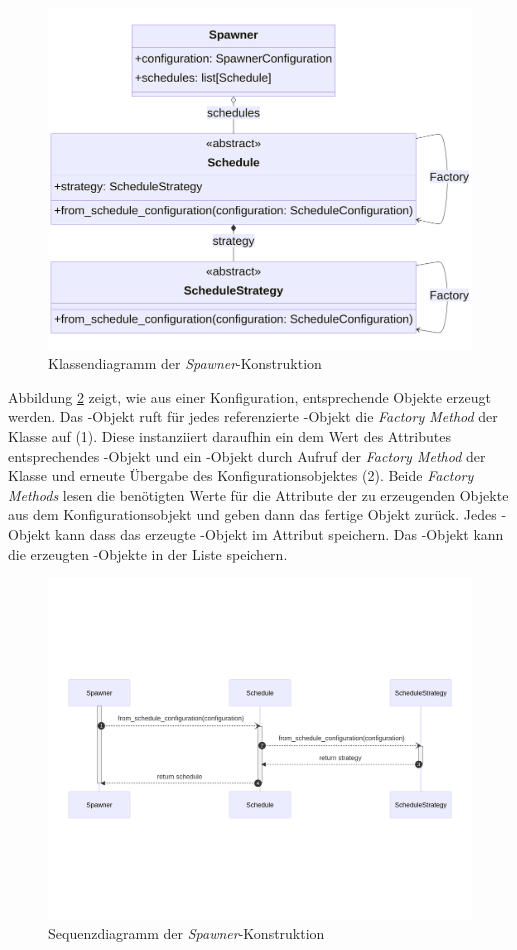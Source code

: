 \begin{figure}[H]
	\centering
	\includegraphics[width=1.0\linewidth]{images/diagrams/spawner-factory-class.png}
	\caption{Klassendiagramm der \emph{Spawner}-Konstruktion}
	\label{fig:spawner-factory-class}
\end{figure}

Abbildung \ref{fig:spawner-factory-seq} zeigt, wie aus einer Konfiguration, entsprechende Objekte erzeugt werden. Das -Objekt ruft für jedes referenzierte -Objekt die \emph{Factory Method} der Klasse  auf (1). Diese instanziiert daraufhin ein dem Wert des Attributes  entsprechendes -Objekt und ein -Objekt durch Aufruf der \emph{Factory Method} der Klasse  und erneute Übergabe des Konfigurationsobjektes (2). Beide \emph{Factory Methods} lesen die benötigten Werte für die Attribute der zu erzeugenden Objekte aus dem Konfigurationsobjekt und geben dann das fertige Objekt zurück. Jedes -Objekt kann dass das erzeugte -Objekt im Attribut  speichern. Das -Objekt kann die erzeugten -Objekte in der Liste  speichern.

\begin{figure}[H]
	\centering
	\includegraphics[width=1.0\linewidth]{images/diagrams/spawner-factory-seq.png}
	\caption{Sequenzdiagramm der \emph{Spawner}-Konstruktion}
	\label{fig:spawner-factory-seq}
\end{figure}
